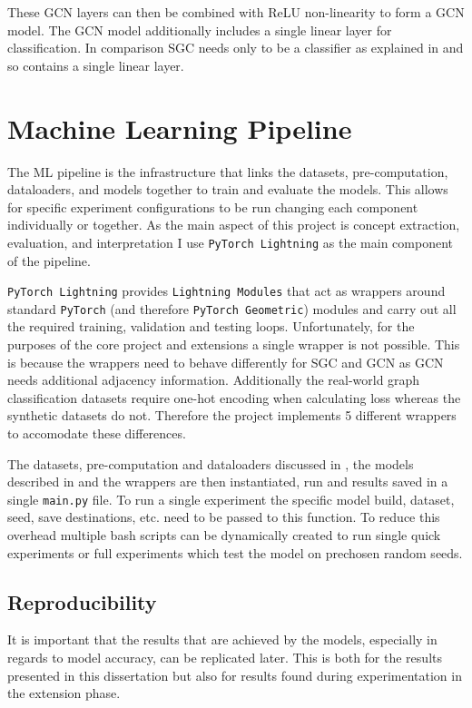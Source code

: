 These GCN layers can then be combined with ReLU non-linearity to form a GCN model.
The GCN model additionally includes a single linear layer for classification.
In comparison SGC needs only to be a classifier as explained in  and so contains a single linear layer.

\section{Machine Learning Pipeline}
\label{sec:pipeline}

The ML pipeline is the infrastructure that links the datasets, pre-computation, dataloaders, and models together to train and evaluate the models.
This allows for specific experiment configurations to be run changing each component individually or together.
As the main aspect of this project is concept extraction, evaluation, and interpretation I use \texttt{PyTorch Lightning} as the main component of the pipeline.

\texttt{PyTorch Lightning} provides \texttt{Lightning Modules} that act as wrappers around standard \texttt{PyTorch} (and therefore \texttt{PyTorch Geometric}) modules and carry out all the required training, validation and testing loops.
Unfortunately, for the purposes of the core project and extensions a single wrapper is not possible.
This is because the wrappers need to behave differently for SGC and GCN as GCN needs additional adjacency information.
Additionally the real-world graph classification datasets require one-hot encoding when calculating loss whereas the synthetic datasets do not.
Therefore the project implements 5 different wrappers to accomodate these differences.

The datasets, pre-computation and dataloaders discussed in , the models described in  and the wrappers are then instantiated, run and results saved in a single \texttt{main.py} file.
To run a single experiment the specific model build, dataset, seed, save destinations, etc. need to be passed to this function.
To reduce this overhead multiple bash scripts can be dynamically created to run single quick experiments or full experiments which test the model on prechosen random seeds.

\subsection{Reproducibility}
\label{sec:reproducibility}
It is important that the results that are achieved by the models, especially in regards to model accuracy, can be replicated later.
This is both for the results presented in this dissertation but also for results found during experimentation in the extension phase.

